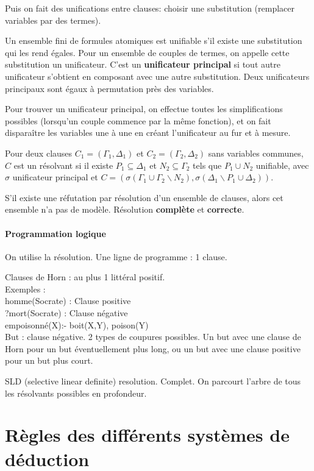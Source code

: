 \documentclass[french]{article}
\begin{document}
Puis on fait des unifications entre clauses:
choisir une substitution (remplacer variables par des termes).

Un ensemble fini de formules atomiques est unifiable s'il existe une substitution qui les rend égales. Pour un ensemble de couples de termes, on appelle cette substitution un unificateur. C'est un \textbf{unificateur principal} si tout autre unificateur s'obtient en composant avec une autre substitution. Deux unificateurs principaux sont égaux à permutation près des variables.

Pour trouver un unificateur principal, on effectue toutes les simplifications possibles (lorsqu'un couple commence par la même fonction), et on fait disparaître les variables une à une en créant l'unificateur au fur et à mesure.

Pour deux clauses $C_1 = (\Gamma_1, \Delta_1)$ et  $C_2 = (\Gamma_2, \Delta_2)$ sans variables communes, $C$ est un résolvant si il existe $P_1\subseteq\Delta_1$ et $N_2\subseteq\Gamma_2$ tels que $P_1\cup N_2$ unifiable, avec $\sigma$ unificateur principal et $C = (\sigma(\Gamma_1\cup\Gamma_2\backslash N_2), \sigma(\Delta_1\backslash P_1\cup\Delta_2))$.

S'il existe une réfutation par résolution d'un ensemble de clauses, alors cet ensemble n'a pas de modèle. Résolution \textbf{complète} et \textbf{correcte}.

\paragraph{Programmation logique}
On utilise la résolution. Une ligne de programme : 1 clause.

Clauses de Horn : au plus 1 littéral positif.\\
Exemples : \\
homme(Socrate) : Clause positive\\
?mort(Socrate) : Clause négative\\
empoisonné(X):- boit(X,Y), poison(Y)\\

But : clause négative. 2 types de coupures possibles. Un but avec une clause de Horn pour un but éventuellement plus long, ou un but avec une clause positive pour un but plus court.

SLD (selective linear definite) resolution. Complet. On parcourt l'arbre de tous les résolvants possibles en profondeur.
\newpage
\appendix

\section{Règles des différents systèmes de déduction}
\end{document}
